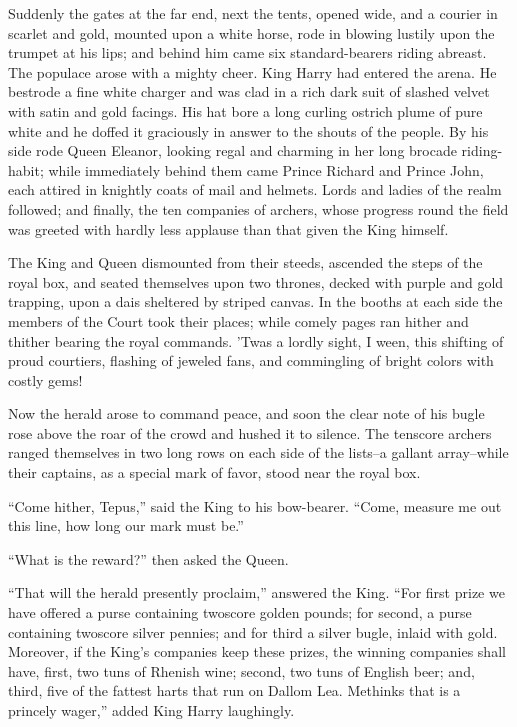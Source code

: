 Suddenly the gates at the far end, next the tents, opened wide, and a
courier in scarlet and gold, mounted upon a white horse, rode in blowing
lustily upon the trumpet at his lips; and behind him came six
standard-bearers riding abreast. The populace arose with a mighty cheer.
King Harry had entered the arena. He bestrode a fine white charger and
was clad in a rich dark suit of slashed velvet with satin and gold
facings. His hat bore a long curling ostrich plume of pure white and he
doffed it graciously in answer to the shouts of the people. By his side
rode Queen Eleanor, looking regal and charming in her long brocade
riding-habit; while immediately behind them came Prince Richard and
Prince John, each attired in knightly coats of mail and helmets. Lords
and ladies of the realm followed; and finally, the ten companies of
archers, whose progress round the field was greeted with hardly less
applause than that given the King himself.

The King and Queen dismounted from their steeds, ascended the steps of
the royal box, and seated themselves upon two thrones, decked with
purple and gold trapping, upon a dais sheltered by striped canvas. In
the booths at each side the members of the Court took their places;
while comely pages ran hither and thither bearing the royal commands.
'Twas a lordly sight, I ween, this shifting of proud courtiers, flashing
of jeweled fans, and commingling of bright colors with costly gems!

Now the herald arose to command peace, and soon the clear note of his
bugle rose above the roar of the crowd and hushed it to silence. The
tenscore archers ranged themselves in two long rows on each side of the
lists--a gallant array--while their captains, as a special mark of
favor, stood near the royal box.

``Come hither, Tepus,'' said the King to his bow-bearer. ``Come, measure
me out this line, how long our mark must be.''

``What is the reward?'' then asked the Queen.

``That will the herald presently proclaim,'' answered the King. ``For
first prize we have offered a purse containing twoscore golden pounds;
for second, a purse containing twoscore silver pennies; and for third a
silver bugle, inlaid with gold. Moreover, if the King's companies keep
these prizes, the winning companies shall have, first, two tuns of
Rhenish wine; second, two tuns of English beer; and, third, five of the
fattest harts that run on Dallom Lea. Methinks that is a princely
wager,'' added King Harry laughingly.

